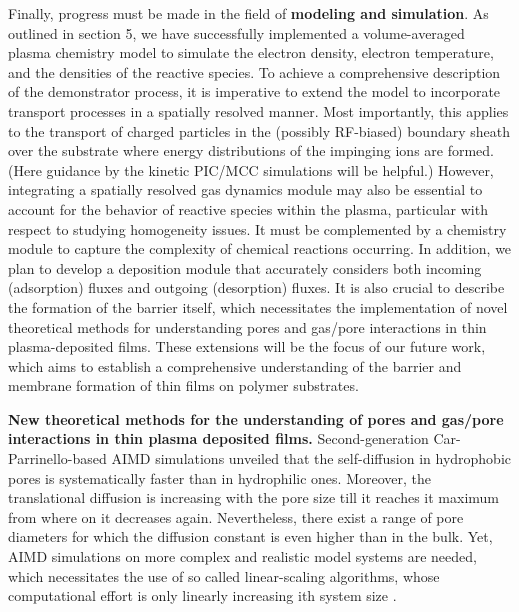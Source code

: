 \documentclass[AMA,STIX2COL]{WileyNJD-v2} %
\begin{document}
Finally, progress must be made in the field of \textbf{modeling and simulation}. As outlined in section 5, we have successfully implemented a volume-averaged plasma chemistry model to simulate the electron density, electron temperature, and the densities of the reactive species.
To achieve a comprehensive description of the demonstrator process, it is imperative to extend the model to incorporate transport processes in a spatially resolved manner. Most importantly,
this applies to the transport of charged particles in the (possibly RF-biased) boundary sheath
over the substrate where energy distributions of the impinging ions are formed.
(Here guidance by the kinetic PIC/MCC simulations will be helpful.)
However, integrating a spatially resolved gas dynamics module may also be essential to account for the behavior of reactive species within the plasma, particular with respect to studying
homogeneity issues. It must be complemented by a chemistry module to capture the complexity of chemical reactions occurring.
In addition, we plan to develop a deposition module that accurately considers both incoming (adsorption) fluxes and outgoing (desorption) fluxes. It is also crucial to describe the formation of the barrier itself, which necessitates the implementation of novel theoretical methods for understanding pores and gas/pore interactions in thin plasma-deposited films. These extensions will be the focus of our future work, which aims to establish a comprehensive understanding of the barrier and membrane formation of thin films on polymer substrates.

\textbf{New theoretical methods for the understanding of pores and gas/pore interactions in thin plasma deposited films.} Second-generation Car-Parrinello-based AIMD simulations unveiled that the self-diffusion in hydrophobic pores is systematically faster than in hydrophilic ones. Moreover, the translational diffusion is increasing with the pore size till it reaches it maximum from where on it decreases again. Nevertheless, there exist a range of pore diameters for which the diffusion constant is even higher than in the bulk. Yet, AIMD simulations on more complex and realistic model systems are needed, which necessitates the use of so called linear-scaling algorithms, whose computational effort is only linearly increasing ith system size \cite{Richters2014,Schade2022}.

\end{document}
